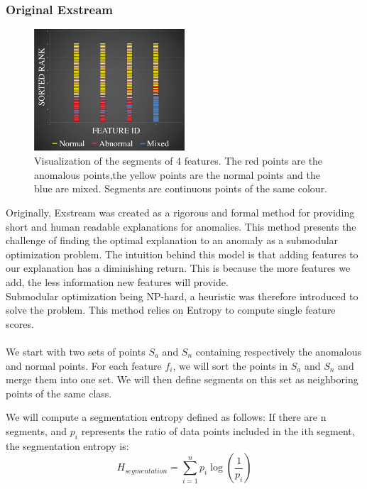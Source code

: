 \documentclass[oneside, a4paper, onecolumn, 11pt]{article}
\begin{document}
\subsubsection{Original Exstream}
\begin{figure}[h]
  \centering
  \includegraphics[width=0.5\textwidth]{images/exstreamplot.png}
  \caption{Visualization of the segments of 4 features. The red points are the anomalous points,the yellow points are the normal points and the blue are mixed. Segments are continuous points of the same colour.}
  \label{fig:exstreamplot}
\end{figure}
Originally, Exstream was created as a rigorous and formal method for providing short and human readable explanations for anomalies. This method presents the challenge of finding the optimal explanation to an anomaly as a submodular optimization problem. The intuition behind this model is that adding features to our explanation has a diminishing return. This is because the more features we add, the less information new features will provide.\\
Submodular optimization being NP-hard, a heuristic was therefore introduced to solve the problem. This method relies on Entropy to compute single feature scores.\\\\
We start with two sets of points $S_a$ and $S_n$ containing respectively the anomalous and normal points.
For each feature $f_i$, we will sort the points in $S_a$ and $S_n$ and merge them into one set. We will then define segments on this set as neighboring points of the same class.

We will compute a segmentation entropy defined as follows:
If there are n segments, and $p_i$ represents the ratio of data points included in the ith segment, the segmentation entropy is:
\begin{equation}
    H_{segmentation} = \sum_{i=1}^{n} p_i \log(\frac{1}{p_i})
\end{equation}
\end{document}

